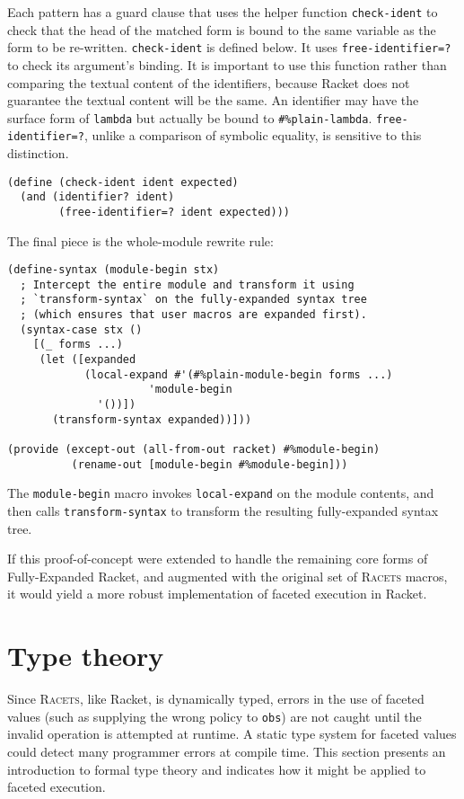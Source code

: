 \documentclass{article}
\begin{document}
Each pattern has a guard clause that uses the helper function \texttt{check-ident} to check that the head of the matched form is bound to the same variable as the form to be re-written. \texttt{check-ident} is defined below. It uses \texttt{free-identifier=?} to check its argument's binding. It is important to use this function rather than comparing the textual content of the identifiers, because Racket does not guarantee the textual content will be the same. An identifier may have the surface form of \texttt{lambda} but actually be bound to \texttt{\#\%plain-lambda}. \texttt{free-identifier=?}, unlike a comparison of symbolic equality, is sensitive to this distinction.

\begin{lstlisting}
(define (check-ident ident expected)
  (and (identifier? ident)
        (free-identifier=? ident expected)))
\end{lstlisting}

The final piece is the whole-module rewrite rule:

\begin{lstlisting}
(define-syntax (module-begin stx)
  ; Intercept the entire module and transform it using
  ; `transform-syntax` on the fully-expanded syntax tree
  ; (which ensures that user macros are expanded first).
  (syntax-case stx ()
    [(_ forms ...)
     (let ([expanded
            (local-expand #'(#%plain-module-begin forms ...)
	                  'module-begin
			  '())])
       (transform-syntax expanded))]))

(provide (except-out (all-from-out racket) #%module-begin)
          (rename-out [module-begin #%module-begin]))
\end{lstlisting}

The \texttt{module-begin} macro invokes \texttt{local-expand} on the module contents, and then calls \texttt{transform-syntax} to transform the resulting fully-expanded syntax tree.

If this proof-of-concept were extended to handle the remaining core forms of Fully-Expanded Racket, and augmented with the original set of \textsc{Racets} macros, it would yield a more robust implementation of faceted execution in Racket.



\section{Type theory\label{sec:types}}
Since \textsc{Racets}, like Racket, is dynamically typed, errors in the use of faceted values (such as supplying the wrong policy to \texttt{obs}) are not caught until the invalid operation is attempted at runtime. A static type system for faceted values could detect many programmer errors at compile time. This section presents an introduction to formal type theory and indicates how it might be applied to faceted execution.
\end{document}
